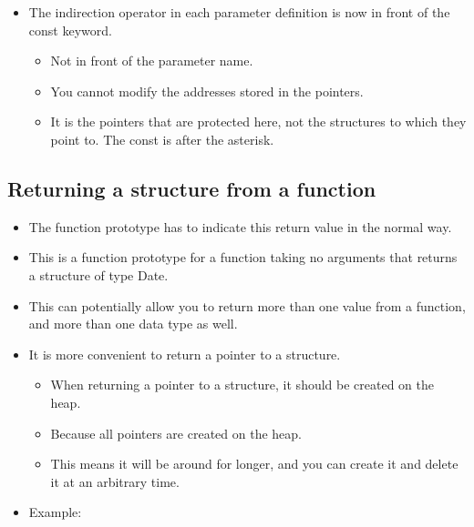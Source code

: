 \begin{itemize}
    \item The indirection operator in each parameter definition is now in front of the const keyword.
        \begin{itemize}
            \item Not in front of the parameter name.
            \item You cannot modify the addresses stored in the pointers. 
            \item It is the pointers that are protected here, not the structures to which they point to. The const is after the asterisk.
        \end{itemize}
\end{itemize}

\subsection{Returning a structure from a function}
\begin{itemize}
    \item The function prototype has to indicate this return value in the normal way.
    
    \item This is a function prototype for a function taking no arguments that returns a structure of type Date. 
    \item This can potentially allow you to return more than one value from a function, and more than one data type as well. 
    \item It is more convenient to return a pointer to a structure.
        \begin{itemize}
            \item When returning a pointer to a structure, it should be created on the heap. 
            \item Because all pointers are created on the heap.
            \item This means it will be around for longer, and you can create it and delete it at an arbitrary time.
        \end{itemize}
    
    \item Example:
\end{itemize}

